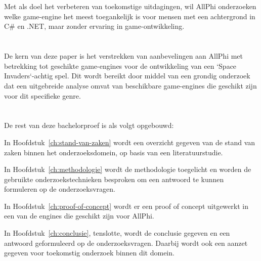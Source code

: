 \section{}%
\label{sec:onderzoeksvraag}

Met als doel het verbeteren van toekomstige uitdagingen, wil AllPhi onderzoeken welke game-engine het meest toegankelijk is voor mensen met een achtergrond in C\# en .NET, maar zonder ervaring in game-ontwikkeling.

\section{}%
\label{sec:onderzoeksdoelstelling}

De kern van deze paper is het verstrekken van aanbevelingen aan AllPhi met betrekking tot geschikte game-engines voor de ontwikkeling van een `Space Invaders`-achtig spel. Dit wordt bereikt door middel van een grondig onderzoek dat een uitgebreide analyse omvat van beschikbare game-engines die geschikt zijn voor dit specifieke genre.

\section{}%
\label{sec:opzet-bachelorproef}


De rest van deze bachelorproef is als volgt opgebouwd:

In Hoofdstuk~\ref{ch:stand-van-zaken} wordt een overzicht gegeven van de stand van zaken binnen het onderzoeksdomein, op basis van een literatuurstudie.

In Hoofdstuk~\ref{ch:methodologie} wordt de methodologie toegelicht en worden de gebruikte onderzoekstechnieken besproken om een antwoord te kunnen formuleren op de onderzoeksvragen.

In Hoofdstuk~\ref{ch:proof-of-concept} wordt er een proof of concept uitgewerkt in een van de engines die geschikt zijn voor AllPhi.

In Hoofdstuk~\ref{ch:conclusie}, tenslotte, wordt de conclusie gegeven en een antwoord geformuleerd op de onderzoeksvragen. Daarbij wordt ook een aanzet gegeven voor toekomstig onderzoek binnen dit domein.